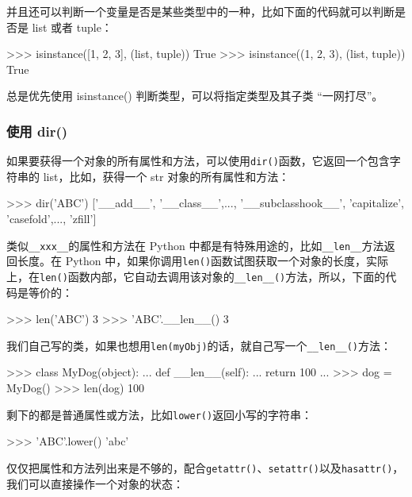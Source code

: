 并且还可以判断一个变量是否是某些类型中的一种，比如下面的代码就可以判断是否是
list 或者 tuple：

\begin{pythoncode}
>>> isinstance([1, 2, 3], (list, tuple))
True
>>> isinstance((1, 2, 3), (list, tuple))
True
\end{pythoncode}

总是优先使用 isinstance() 判断类型，可以将指定类型及其子类
``一网打尽''。

\hypertarget{ux4f7fux7528-dir}{%
\subsubsection{使用 dir()}\label{ux4f7fux7528-dir}}

如果要获得一个对象的所有属性和方法，可以使用\texttt{dir()}函数，它返回一个包含字符串的
list，比如，获得一个 str 对象的所有属性和方法：

\begin{pythoncode}
>>> dir('ABC')
['__add__', '__class__',..., '__subclasshook__', 'capitalize', 'casefold',..., 'zfill']
\end{pythoncode}

类似\texttt{\_\_xxx\_\_}的属性和方法在 Python
中都是有特殊用途的，比如\texttt{\_\_len\_\_}方法返回长度。在 Python
中，如果你调用\texttt{len()}函数试图获取一个对象的长度，实际上，在\texttt{len()}函数内部，它自动去调用该对象的\texttt{\_\_len\_\_()}方法，所以，下面的代码是等价的：

\begin{pythoncode}
>>> len('ABC')
3
>>> 'ABC'.__len__()
3
\end{pythoncode}

我们自己写的类，如果也想用\texttt{len(myObj)}的话，就自己写一个\texttt{\_\_len\_\_()}方法：

\begin{pythoncode}
>>> class MyDog(object):
...     def __len__(self):
...         return 100
...
>>> dog = MyDog()
>>> len(dog)
100
\end{pythoncode}

剩下的都是普通属性或方法，比如\texttt{lower()}返回小写的字符串：

\begin{pythoncode}
>>> 'ABC'.lower()
'abc'
\end{pythoncode}

仅仅把属性和方法列出来是不够的，配合\texttt{getattr()}、\texttt{setattr()}以及\texttt{hasattr()}，我们可以直接操作一个对象的状态：

